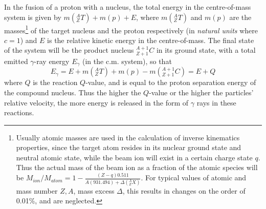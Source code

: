In the fusion of a proton with a nucleus, the total energy in the centre-of-mass system is given by $m(^{A}_{Z}T)+m(p)+E$, where $m(^{A}_{Z}T)$ and $m(p)$ are the masses\footnote{Usually atomic masses are used in the calculation of inverse kinematics properties, since the target atom resides in its nuclear ground state and neutral atomic state, while the beam ion will exist in a certain charge state $q$. Thus the actual mass of the beam ion as a fraction of the atomic species will be $M_{ion}/M_{atom}=1-\frac{(Z-q)0.511}{A(931.494)+\Delta(^{A}_{Z}X)}$. For typical values of atomic and mass number $Z,A$, mass excess $\Delta$, this results in changes on the order of 0.01\%, and are neglected.} of the target nucleus and the proton respectively (in {\em natural units} where $c=1$) and $E$ is the relative kinetic energy in the centre-of-mass. The final state of the system will be the product nucleus $^{A+1}_{Z+1}C$ in its ground state, with a total emitted $\gamma$-ray energy $E_{\gamma}$ (in the c.m. system), so that
\begin{equation}
E_{\gamma}=E+m(^{A}_{Z}T)+m(p)-m(^{A+1}_{Z+1}C)=E+Q
\end{equation}
where $Q$ is the reaction $Q$-value, and is equal to the proton separation energy of the compound nucleus. Thus the higher the $Q$-value or the higher the particles' relative velocity, the more energy is released in the form of $\gamma$ rays in these reactions. 
 
